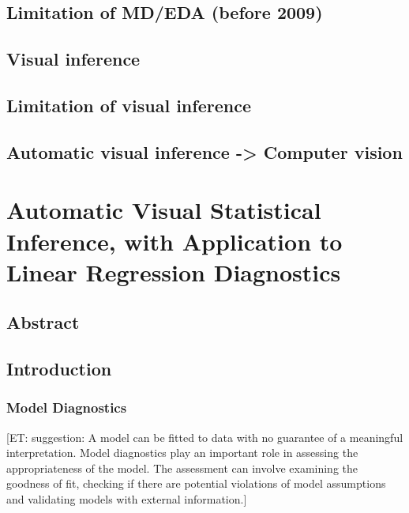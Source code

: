 \documentclass{monashthesis}
\begin{document}
\hypertarget{limitation-of-mdeda-before-2009}{%
\section{Limitation of MD/EDA (before 2009)}\label{limitation-of-mdeda-before-2009}}

\hypertarget{visual-inference}{%
\section{Visual inference}\label{visual-inference}}

\hypertarget{limitation-of-visual-inference}{%
\section{Limitation of visual inference}\label{limitation-of-visual-inference}}

\hypertarget{automatic-visual-inference---computer-vision}{%
\section{Automatic visual inference -\textgreater{} Computer vision}\label{automatic-visual-inference---computer-vision}}

\hypertarget{ch:paper1}{%
\chapter{Automatic Visual Statistical Inference, with Application to Linear Regression Diagnostics}\label{ch:paper1}}

\hypertarget{abstract-1}{%
\section{Abstract}\label{abstract-1}}

\hypertarget{introduction}{%
\section{Introduction}\label{introduction}}

\hypertarget{model-diagnostics}{%
\subsection{Model Diagnostics}\label{model-diagnostics}}

{[}ET: suggestion: A model can be fitted to data with no guarantee of a meaningful interpretation. Model diagnostics play an important role in assessing the appropriateness of the model. The assessment can involve examining the goodness of fit, checking if there are potential violations of model assumptions and validating models with external information.{]}
\end{document}
